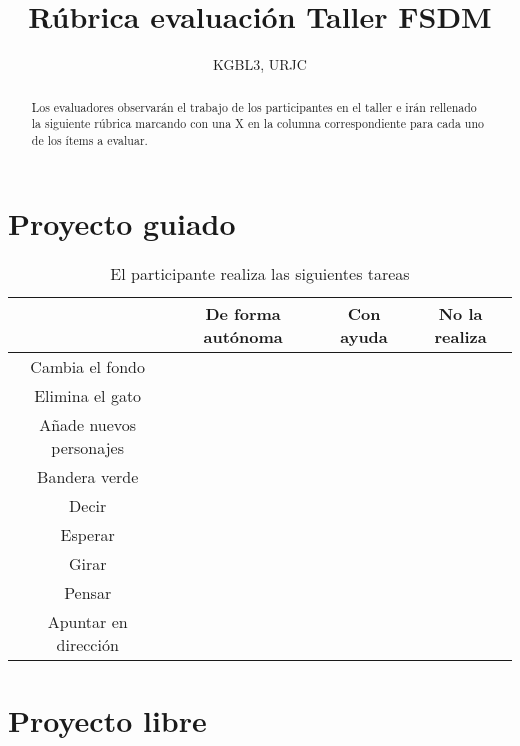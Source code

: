 \documentclass[a4paper,10pt]{article}
\title{Rúbrica evaluación Taller FSDM}
\author{KGBL3, URJC}
\date{}
\begin{document}
\maketitle

\begin{abstract}
Los evaluadores observarán el trabajo de los participantes en el taller e irán rellenado la siguiente rúbrica marcando con una X en la columna correspondiente para cada uno de los ítems a evaluar.
\end{abstract}

\section{Proyecto guiado}
\begin{table}[H]
\centering
\caption{El participante realiza las siguientes tareas}
\label{my-label}
\begin{tabular}{cccc}
\hline
 & De forma autónoma & Con ayuda & No la realiza\\ \hline
Cambia el fondo &  &  & \\
Elimina el gato &  &  &\\
Añade nuevos personajes &  &  &\\
Bandera verde &  &  &\\
Decir &  &  &\\
Esperar &  &  &\\
Girar &  &  &\\
Pensar &  &  &\\
Apuntar en dirección &  &  &\\ \hline
\end{tabular}
\end{table}


\section{Proyecto libre}
\end{document}
